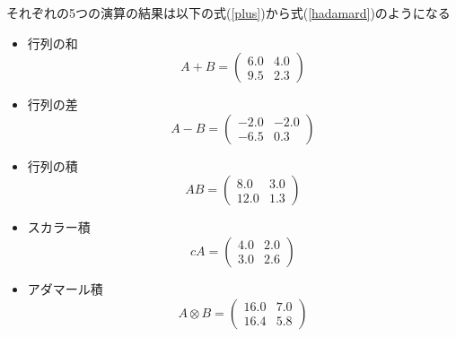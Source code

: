 \documentclass{article}
\begin{document}
それぞれの5つの演算の結果は以下の式(\ref{plus})から式(\ref{hadamard})のようになる

\begin{itemize}
    \item 行列の和
        \begin{equation}
        \label{plus}
            A + B = \left(
            \begin{array}{cc}
              6.0& 4.0 \\
              9.5 & 2.3
            \end{array}
            \right)
        \end{equation}
        
    \item 行列の差
        \begin{equation}
        \label{minus}
            A - B = \left(
            \begin{array}{cc}
              -2.0 & -2.0 \\
              -6.5 & 0.3 
            \end{array}
            \right)
        \end{equation}
    
    \item 行列の積    
        \begin{equation}
        \label{times}
            AB = \left(
            \begin{array}{cc}
              8.0 & 3.0 \\
              12.0 & 1.3
            \end{array}
            \right)
        \end{equation}
    
    \item スカラー積    
        \begin{equation}
        \label{scalar}
            cA = \left(
            \begin{array}{cc}
             4.0 & 2.0 \\
             3.0 & 2.6
            \end{array}
            \right)
        \end{equation}
    
    \item アダマール積
        \begin{equation}
        \label{hadamard}
            A \otimes B = 
            \left(
            \begin{array}{cc}
              16.0 & 7.0 \\
              16.4 & 5.8
            \end{array}
            \right)
        \end{equation}

\end{itemize}
\end{document}

